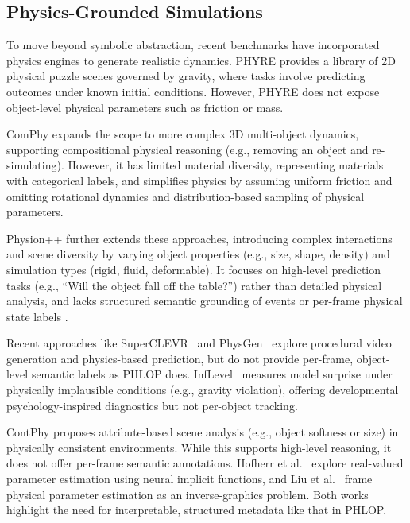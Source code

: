 \documentclass[conference]{IEEEtran}
\begin{document}
\subsection{Physics-Grounded Simulations}

To move beyond symbolic abstraction, recent benchmarks have incorporated physics engines to generate realistic dynamics. PHYRE \cite{bakhtin2019phyre} provides a library of 2D physical puzzle scenes governed by gravity, where tasks involve predicting outcomes under known initial conditions. However, PHYRE does not expose object-level physical parameters such as friction or mass.

 
ComPhy \cite{chen2022comphy} expands the scope to more complex 3D multi-object dynamics, supporting compositional physical reasoning (e.g., removing an object and re-simulating). However, it has limited material diversity, representing materials with categorical labels, and simplifies physics by assuming uniform friction and omitting rotational dynamics and distribution-based sampling of physical parameters.

Physion++ \cite{tung2023physion++} further extends these approaches, introducing complex interactions and scene diversity by varying object properties (e.g., size, shape, density) and simulation types (rigid, fluid, deformable). It focuses on high-level prediction tasks (e.g., ``Will the object fall off the table?'') rather than detailed physical analysis, and lacks structured semantic grounding of events or per-frame physical state labels \cite{tung2023physion++}. 

Recent approaches like SuperCLEVR~\cite{superclevr2024} and PhysGen~\cite{physgen2024} explore procedural video generation and physics-based prediction, but do not provide per-frame, object-level semantic labels as PHLOP does. InfLevel~\cite{piloto2022infant} measures model surprise under physically implausible conditions (e.g., gravity violation), offering developmental psychology-inspired diagnostics but not per-object tracking.


ContPhy \cite{zhang2024contphy} proposes attribute-based scene analysis (e.g., object softness or size) in physically consistent environments. While this supports high-level reasoning, it does not offer per-frame semantic annotations. Hofherr et al.~\cite{hofherr2023neural} explore real-valued parameter estimation using neural implicit functions, and Liu et al.~\cite{physicsinverse2024} frame physical parameter estimation as an inverse-graphics problem. Both works highlight the need for interpretable, structured metadata like that in PHLOP.
\end{document}
